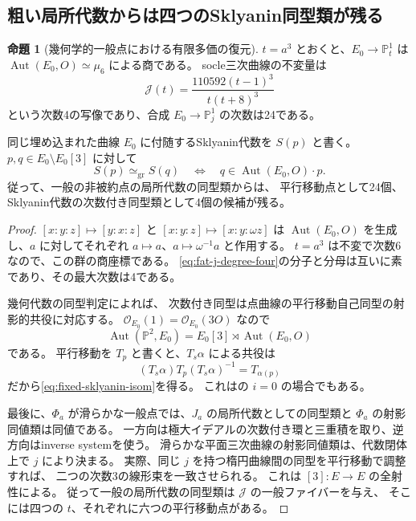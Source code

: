 \documentclass[a4paper,11pt]{ltjsarticle}
\theoremstyle{definition}
\newtheorem{theorem}{命題}[section]
\newcommand{\OO}{\mathcal O}
\newcommand{\PP}{\mathbb P}
\begin{document}
\subsection{粗い局所代数からは四つのSklyanin同型類が残る}

\begin{theorem}[幾何学的一般点における有限多価の復元]\label{thm:four-sklyanin-classes}
$t=a^3$ とおくと、$E_0\to\PP^1_t$ は
$\operatorname{Aut}(E_0,O)\simeq\mu_6$ による商である。
socle三次曲線の不変量は
\begin{equation}\label{eq:fat-j-degree-four}
 \mathcal J(t)=\frac{110592(t-1)^3}{t(t+8)^3}
\end{equation}
という次数4の写像であり、合成 $E_0\to\PP^1_j$ の次数は24である。

同じ埋め込まれた曲線 $E_0$ に付随するSklyanin代数を $S(p)$ と書く。
$p,q\in E_0\setminus E_0[3]$ に対して
\begin{equation}\label{eq:fixed-sklyanin-isom}
 S(p)\simeq_{\mathrm{gr}}S(q)
 \quad\Longleftrightarrow\quad
 q\in\operatorname{Aut}(E_0,O)\cdot p.
\end{equation}
従って、一般の非被約点の局所代数の同型類からは、
平行移動点として24個、Sklyanin代数の次数付き同型類として4個の候補が残る。
\end{theorem}

\begin{proof}
$[x:y:z]\mapsto[y:x:z]$ と $[x:y:z]\mapsto[x:y:\omega z]$ は
$\operatorname{Aut}(E_0,O)$ を生成し、$a$ に対してそれぞれ
$a\mapsto a$、$a\mapsto\omega^{-1}a$ と作用する。
$t=a^3$ は不変で次数6なので、この群の商座標である。
\eqref{eq:fat-j-degree-four}の分子と分母は互いに素であり、その最大次数は4である。

幾何代数の同型判定\cite[Theorem 2.8]{IMRelations}によれば、
次数付き同型は点曲線の平行移動自己同型の射影的共役に対応する。
$\OO_{E_0}(1)=\OO_{E_0}(3O)$ なので
\[
 \operatorname{Aut}(\PP^2,E_0)
 =E_0[3]\rtimes\operatorname{Aut}(E_0,O)
\]
である\cite[Theorem 4.12]{IMRelations}。
平行移動を $T_p$ と書くと、$T_s\alpha$ による共役は
\[
 (T_s\alpha)T_p(T_s\alpha)^{-1}=T_{\alpha(p)}
\]
だから\eqref{eq:fixed-sklyanin-isom}を得る。
これは\cite[Theorem 4.16 and Lemma 4.17]{IMRelations}の $i=0$ の場合でもある。

最後に、$\Phi_a$ が滑らかな一般点では、$J_a$ の局所代数としての同型類と
$\Phi_a$ の射影同値類は同値である。
一方向は極大イデアルの次数付き環と三重積を取り、逆方向はinverse systemを使う。
滑らかな平面三次曲線の射影同値類は、代数閉体上で $j$ により決まる。
実際、同じ $j$ を持つ楕円曲線間の同型を平行移動で調整すれば、
二つの次数3の線形束を一致させられる。
これは $[3]:E\to E$ の全射性による。
従って一般の局所代数の同型類は $\mathcal J$ の一般ファイバーを与え、
そこには四つの $t$、それぞれに六つの平行移動点がある。
\end{proof}
\end{document}
